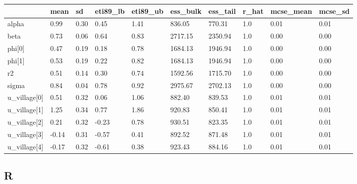 \documentclass[
  letterpaper,
  DIV=11,
  numbers=noendperiod]{scrartcl}
\begin{document}
\begin{longtable}[]{@{}llllllllll@{}}
\toprule\noalign{}
& mean & sd & eti89\_lb & eti89\_ub & ess\_bulk & ess\_tail & r\_hat &
mcse\_mean & mcse\_sd \\
\midrule\noalign{}
\endhead
\bottomrule\noalign{}
\endlastfoot
alpha & 0.99 & 0.30 & 0.45 & 1.41 & 836.05 & 770.31 & 1.0 & 0.01 &
0.01 \\
beta & 0.73 & 0.06 & 0.64 & 0.83 & 2717.15 & 2350.94 & 1.0 & 0.00 &
0.00 \\
phi{[}0{]} & 0.47 & 0.19 & 0.18 & 0.78 & 1684.13 & 1946.94 & 1.0 & 0.00
& 0.00 \\
phi{[}1{]} & 0.53 & 0.19 & 0.22 & 0.82 & 1684.13 & 1946.94 & 1.0 & 0.00
& 0.00 \\
r2 & 0.51 & 0.14 & 0.30 & 0.74 & 1592.56 & 1715.70 & 1.0 & 0.00 &
0.00 \\
sigma & 0.84 & 0.04 & 0.78 & 0.92 & 2975.67 & 2702.13 & 1.0 & 0.00 &
0.00 \\
u\_village{[}0{]} & 0.51 & 0.32 & 0.06 & 1.06 & 882.40 & 839.53 & 1.0 &
0.01 & 0.01 \\
u\_village{[}1{]} & 1.25 & 0.34 & 0.77 & 1.86 & 920.83 & 850.41 & 1.0 &
0.01 & 0.01 \\
u\_village{[}2{]} & 0.21 & 0.32 & -0.23 & 0.78 & 930.51 & 823.35 & 1.0 &
0.01 & 0.01 \\
u\_village{[}3{]} & -0.14 & 0.31 & -0.57 & 0.41 & 892.52 & 871.48 & 1.0
& 0.01 & 0.01 \\
u\_village{[}4{]} & -0.17 & 0.32 & -0.61 & 0.38 & 923.43 & 884.16 & 1.0
& 0.01 & 0.01 \\
\end{longtable}

\subsection{R}
\end{document}
